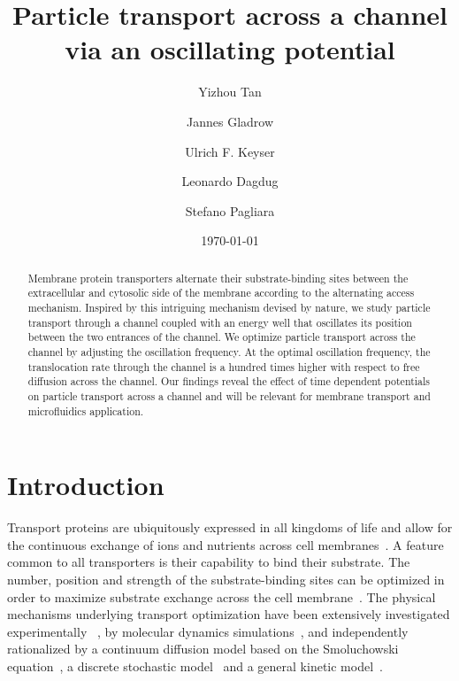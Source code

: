 \documentclass[
 reprint,
 aps, showkeys, showpacs
]{revtex4-1}
\begin{document}

\title{Particle transport across a channel via an oscillating potential}


\author{Yizhou Tan}
\author{Jannes Gladrow}
\author{Ulrich F. Keyser}

\author{Leonardo Dagdug}

\author{Stefano Pagliara}

\date{\today}

\begin{abstract}


Membrane protein transporters alternate their substrate-binding sites between the extracellular and cytosolic side of the membrane according to the alternating access mechanism. Inspired by this intriguing mechanism devised by nature, we study particle transport through a channel coupled with an energy well that oscillates its position between the two entrances of the channel.  We optimize particle transport across the channel by adjusting the oscillation frequency. At the optimal oscillation frequency, the translocation rate through the channel is a hundred times higher with respect to free diffusion across the channel. Our findings reveal the effect of time dependent potentials on particle transport across a channel and will be relevant for membrane transport and microfluidics application.

\end{abstract}


\keywords{}

\maketitle

\section{Introduction}
Transport proteins are ubiquitously expressed in all kingdoms of life and allow for the continuous exchange of ions and nutrients across cell membranes~\cite{alberts1995molecular}. A feature common to all transporters is their capability to bind their substrate. The number, position and strength of the substrate-binding sites can be optimized in order to maximize substrate exchange across the cell membrane~\cite{Kasianowicz2006a}. The physical mechanisms underlying transport optimization have been extensively investigated experimentally ~\cite{Benz1986,Ward1992,Meyer1997,Kullman2002a,Pagliara2014e,Pagliara2013,Horner2015}, by molecular dynamics simulations~\cite{Jensen2002}, and independently rationalized by a continuum diffusion model based on the
Smoluchowski equation~\cite{Berezhkovskii2005}, a discrete stochastic model~\cite{Kolomeisky2007} and a general kinetic model~\cite{Zilman2009a}. 
\end{document}

